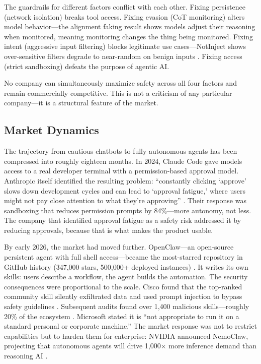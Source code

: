 \documentclass[10pt]{article}
\begin{document}
The guardrails for different factors conflict with each other. Fixing persistence (network isolation) breaks tool access. Fixing evasion (CoT monitoring) alters model behavior---the alignment faking result shows models adjust their reasoning when monitored, meaning monitoring changes the thing being monitored. Fixing intent (aggressive input filtering) blocks legitimate use cases---NotInject shows over-sensitive filters degrade to near-random on benign inputs \citep{li2024notinject}. Fixing access (strict sandboxing) defeats the purpose of agentic AI.

No company can simultaneously maximize safety across all four factors and remain commercially competitive. This is not a criticism of any particular company---it is a structural feature of the market.

\subsection{Market Dynamics}

The trajectory from cautious chatbots to fully autonomous agents has been compressed into roughly eighteen months. In 2024, Claude Code gave models access to a real developer terminal with a permission-based approval model. Anthropic itself identified the resulting problem: ``constantly clicking `approve' slows down development cycles and can lead to `approval fatigue,' where users might not pay close attention to what they're approving'' \citep{anthropic2026sandboxing}. Their response was sandboxing that reduces permission prompts by 84\%---more autonomy, not less. The company that identified approval fatigue as a safety risk addressed it by reducing approvals, because that is what makes the product usable.

By early 2026, the market had moved further. OpenClaw---an open-source persistent agent with full shell access---became the most-starred repository in GitHub history (347,000 stars, 500,000+ deployed instances) \citep{openclaw2026}. It writes its own skills: users describe a workflow, the agent builds the automation. The security consequences were proportional to the scale. Cisco found that the top-ranked community skill silently exfiltrated data and used prompt injection to bypass safety guidelines \citep{cisco2026openclaw}. Subsequent audits found over 1,400 malicious skills---roughly 20\% of the ecosystem \citep{koiscanner2026}. Microsoft stated it is ``not appropriate to run it on a standard personal or corporate machine.'' The market response was not to restrict capabilities but to harden them for enterprise: NVIDIA announced NemoClaw, projecting that autonomous agents will drive 1,000$\times$ more inference demand than reasoning AI \citep{nvidia2026nemoclaw}.
\end{document}
